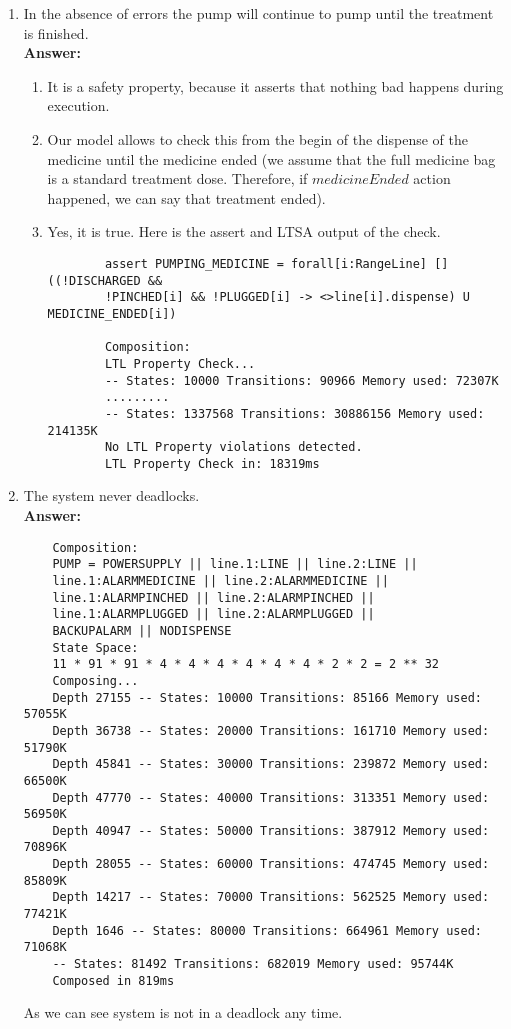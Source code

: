 \documentclass{article}
\begin{document}
\begin{enumerate}
    \item In the absence of errors the pump will continue to pump until the treatment is finished.\\
    \textbf{Answer:} 
    \begin{enumerate}
    	\item It is a safety property, because it asserts that nothing bad happens during execution.
    	\item Our model allows to check this from the begin of the dispense of the medicine until the medicine ended 
    	(we assume that the full medicine bag is a standard treatment dose. Therefore, if $medicineEnded$ action happened, we
    	can say that treatment ended).
    	\item Yes, it is true. Here is the assert and LTSA output of the check.
    	\begin{verbatim}
    	assert PUMPING_MEDICINE = forall[i:RangeLine] []((!DISCHARGED && 
    	!PINCHED[i] && !PLUGGED[i] -> <>line[i].dispense) U MEDICINE_ENDED[i])
    	
    	Composition:
    	LTL Property Check...
    	-- States: 10000 Transitions: 90966 Memory used: 72307K
    	.........
    	-- States: 1337568 Transitions: 30886156 Memory used: 214135K
    	No LTL Property violations detected.
    	LTL Property Check in: 18319ms
\end{verbatim}
	\end{enumerate}
    \item The system never deadlocks.\\
    \textbf{Answer:}
    \begin{verbatim}
    Composition:
    PUMP = POWERSUPPLY || line.1:LINE || line.2:LINE || 
    line.1:ALARMMEDICINE || line.2:ALARMMEDICINE ||
    line.1:ALARMPINCHED || line.2:ALARMPINCHED ||
    line.1:ALARMPLUGGED || line.2:ALARMPLUGGED || 
    BACKUPALARM || NODISPENSE
    State Space:
    11 * 91 * 91 * 4 * 4 * 4 * 4 * 4 * 4 * 2 * 2 = 2 ** 32
    Composing...
    Depth 27155 -- States: 10000 Transitions: 85166 Memory used: 57055K
    Depth 36738 -- States: 20000 Transitions: 161710 Memory used: 51790K
    Depth 45841 -- States: 30000 Transitions: 239872 Memory used: 66500K
    Depth 47770 -- States: 40000 Transitions: 313351 Memory used: 56950K
    Depth 40947 -- States: 50000 Transitions: 387912 Memory used: 70896K
    Depth 28055 -- States: 60000 Transitions: 474745 Memory used: 85809K
    Depth 14217 -- States: 70000 Transitions: 562525 Memory used: 77421K
    Depth 1646 -- States: 80000 Transitions: 664961 Memory used: 71068K
    -- States: 81492 Transitions: 682019 Memory used: 95744K
    Composed in 819ms
    \end{verbatim}
    As we can see system is not in a deadlock any time.
    

\end{enumerate}
\end{document}
